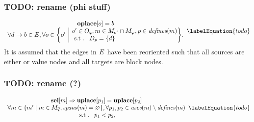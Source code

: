 \subsubsection{TODO: rename (phi stuff)}



\begin{equation}
  \begin{array}{c}
    \mVar{oplace}[o] = b \\
    \forall \mEdge{d}{b} \in \mDefEdgeSet,
    \forall o \in
      \mSetBuilder*{o'}%
                   {%
                     \begin{array}{@{}l@{}}
                       o' \in \mOpSet[\mPhi] \hspace{-1pt},
                       m \in \mMatchSet[o'] \cap \mPhiMatchSet,
                       p \in \mDefines(m) \\
                       \text{\st }
                       \mDataSet[p] = \mSet{d}
                     \end{array}
                   } \!.
  \end{array}
  \labelEquation{todo}
\end{equation}
%
It is assumed that the \glspl{edge} in $E$ have been reoriented such
that all \glspl{source} are either  or \glspl{value node}
and all \glspl{target} are \glspl{block node}.


\subsubsection{TODO: rename (?)}



\begin{equation}
  \begin{array}{c}
    \mVar{sel}[m] \mImp \mVar{uplace}[p_1] = \mVar{uplace}[p_2] \\
    \forall m \in
      \mSetBuilder{m'}%
                  {%
                    m \in \mPhiMatchCompSet \hspace{-1pt},
                    \mSpans(m) = \mEmptySet
                  },
    \forall p_1, p_2 \in \mUses(m) \setminus \mDefines(m) \\
    \text{\st } p_1 < p_2,
  \end{array}
  \labelEquation{todo}
\end{equation}

